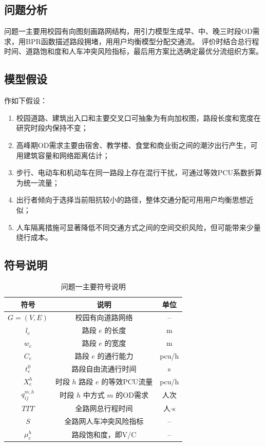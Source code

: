 \documentclass[UTF8,zihao=-4,a4paper]{ctexart}
\numberwithin{table}{section}
\numberwithin{figure}{section}
\numberwithin{equation}{section}
\begin{document}
\subsection{问题分析}

问题一主要用校园有向图刻画路网结构，用引力模型生成早、中、晚三时段OD需求，用BPR函数描述路段拥堵，用用户均衡模型分配交通流。
评价时结合总行程时间、道路饱和度和人车冲突风险指标，最后用方案比选确定最优分流组织方案。

\subsection{模型假设}

作如下假设：
\begin{enumerate}
    \item 校园道路、建筑出入口和主要交叉口可抽象为有向加权图，路段长度和宽度在研究时段内保持不变；
    \item 高峰期OD需求主要由宿舍、教学楼、食堂和商业街之间的潮汐出行产生，可用建筑容量和网络距离估计；
    \item 步行、电动车和机动车在同一路段上存在混行干扰，可通过等效PCU系数折算为统一流量；
    \item 出行者倾向于选择当前阻抗较小的路径，整体交通分配可用用户均衡思想近似；
    \item 人车隔离措施可显著降低不同交通方式之间的空间交织风险，但可能带来少量绕行成本。
\end{enumerate}

\subsection{符号说明}

\begin{table}[H]
\footnotesize
\centering
\caption{问题一主要符号说明}
\label{tab:symbols_q1}
\begin{tabular}{ccc}
\toprule
\textbf{符号} & \textbf{说明} & \textbf{单位} \\
\midrule
$G=(V,E)$ & 校园有向道路网络 & -- \\
$l_e$ & 路段 $e$ 的长度 & m \\
$w_e$ & 路段 $e$ 的宽度 & m \\
$C_e$ & 路段 $e$ 的通行能力 & pcu/h \\
$t_e^0$ & 路段自由流通行时间 & s \\
$X_e^h$ & 时段 $h$ 路段 $e$ 的等效PCU流量 & pcu/h \\
$q_{ij}^{m,h}$ & 时段 $h$ 中方式 $m$ 的OD需求 & 人次 \\
$TTT$ & 全路网总行程时间 & 人$\cdot$s \\
$S$ & 全路网人车冲突风险指标 & -- \\
$\mu_e^h$ & 路段饱和度，即V/C & -- \\
\bottomrule
\end{tabular}
\end{table}
\end{document}
